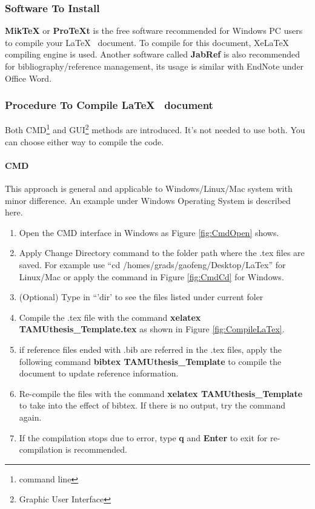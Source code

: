 \subsubsection{Software To Install}
\textbf{MikTeX} or \textbf{ProTeXt} is the free software recommended for Windows PC users to compile your \LaTeX~ document. To compile for this document, XeLaTeX compiling engine is used. Another software called \textbf{JabRef} is also recommended for bibliography/reference management, its usage is similar with EndNote under Office Word.

\subsubsection{Procedure To Compile \LaTeX~ document}
Both CMD\footnote{command line} and GUI\footnote{Graphic User Interface} methods are introduced. It's not needed to use both. You can choose either way to compile the code.
\paragraph{CMD}
This approach is general and applicable to Windows/Linux/Mac system with minor difference. An example under Windows Operating System is described here.

\begin{enumerate}
\item Open the CMD interface in Windows as Figure \ref{fig:CmdOpen} shows.
\item Apply Change Directory command to the folder path where the .tex files are saved. For example use ``cd /homes/grads/gaofeng/Desktop/LaTex'' for Linux/Mac or apply the command in Figure \ref{fig:CmdCd} for Windows.
\item (Optional) Type in ``'dir' to see the files listed under current foler
\item Compile the .tex file with the command \textbf{xelatex TAMUthesis\_Template.tex} as shown in Figure \ref{fig:CompileLaTex}.
\item if reference files ended with .bib are referred in the .tex files, apply the following command \textbf{bibtex TAMUthesis\_Template} to compile the document to update reference information.
\item Re-compile the files with the command \textbf{xelatex TAMUthesis\_Template} to take into the effect of bibtex. If there is no output, try the command again.
\item If the compilation stops due to error, type \textbf{q} and \textbf{Enter} to exit for re-compilation is recommended.
\end{enumerate}

